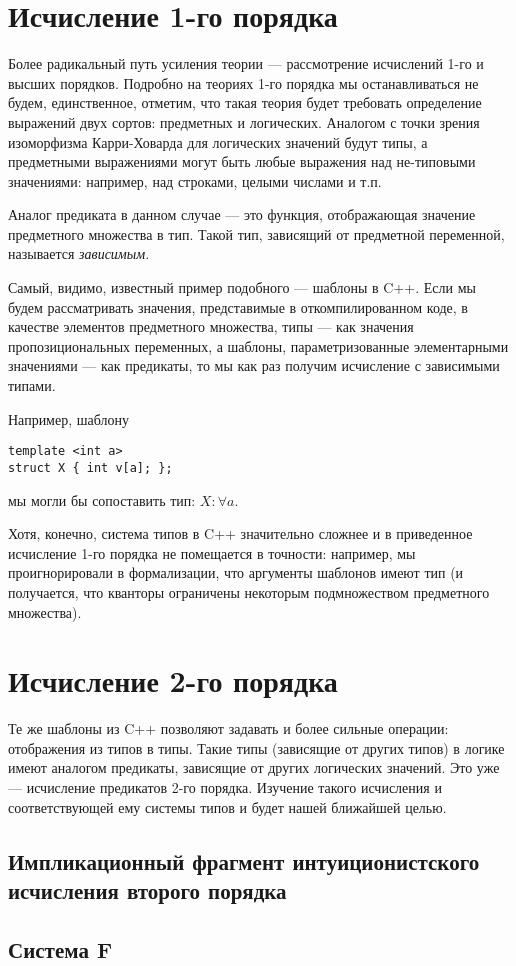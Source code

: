 \section{Исчисление 1-го порядка}

Более радикальный путь усиления теории --- рассмотрение исчислений 1-го и высших порядков.
Подробно на теориях 1-го порядка мы останавливаться не будем, единственное, отметим, что
такая теория будет требовать определение выражений двух сортов: предметных и логических.
Аналогом с точки зрения изоморфизма Карри-Ховарда для логических значений будут типы,
а предметными выражениями могут быть любые выражения над не-типовыми значениями: например,
над строками, целыми числами и т.п. 

Аналог предиката в данном случае --- это функция, отображающая значение предметного множества 
в тип. Такой тип, зависящий от предметной переменной, называется \emph{зависимым}. 

Самый, видимо, известный пример подобного --- шаблоны в C++. Если мы будем рассматривать
значения, представимые в откомпилированном коде, в качестве элементов предметного множества,
типы --- как значения пропозициональных переменных, а шаблоны, параметризованные элементарными 
значениями --- как предикаты, то мы как раз получим исчисление с зависимыми типами.

Например, шаблону
\begin{verbatim}
template <int a>
struct X { int v[a]; };
\end{verbatim}
мы могли бы сопоставить тип: $X:\forall a.$

Хотя, конечно, система типов в C++ значительно сложнее и в приведенное исчисление 1-го порядка
не помещается в точности: например, мы проигнорировали в формализации, что аргументы шаблонов 
имеют тип (и получается, что кванторы ограничены некоторым подмножеством предметного множества).

\section{Исчисление 2-го порядка}

Те же шаблоны из C++ позволяют задавать и более сильные операции: отображения из типов в типы.
Такие типы (зависящие от других типов) в логике имеют аналогом предикаты, зависящие от других
логических значений. Это уже --- исчисление предикатов 2-го порядка.
Изучение такого исчисления и соответствующей ему системы типов и будет нашей ближайшей целью.

\subsection{Импликационный фрагмент интуиционистского исчисления второго порядка}

\subsection{Система F}

\begin{definition}
\end{definition}

